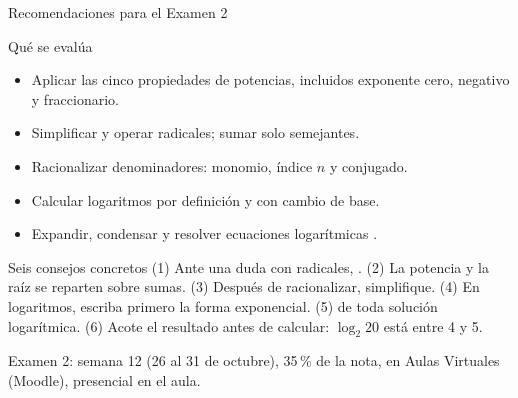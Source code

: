\documentclass[aspectratio=169,10pt]{beamer}
\begin{document}
\begin{frame}{Recomendaciones para el Examen 2}
  \begin{block}{Qué se evalúa}
    \tiny
    \begin{itemize}\setlength{\itemsep}{-0.02cm}
      \item Aplicar las cinco propiedades de potencias, incluidos exponente
            cero, negativo y fraccionario.
      \item Simplificar y operar radicales; sumar solo semejantes.
      \item Racionalizar denominadores: monomio, índice $n$ y conjugado.
      \item Calcular logaritmos por definición y con cambio de base.
      \item Expandir, condensar y resolver ecuaciones logarítmicas
            .
    \end{itemize}
  \end{block}

  \vspace{0.08cm}
  \begin{alertblock}{Seis consejos concretos}
    \tiny
    (1) Ante una duda con radicales, .
    \quad (2) La potencia y la raíz  se reparten sobre sumas.
    \quad (3) Después de racionalizar, simplifique. \quad
    (4) En logaritmos, escriba primero la forma exponencial. \quad
    (5)  de toda solución logarítmica. \quad
    (6) Acote el resultado antes de calcular: $\log_2 20$ está entre 4 y 5.
  \end{alertblock}

  \vspace{0.05cm}
  {\tiny\color{uniGris} Examen 2: semana 12 (26 al 31 de octubre), 35\,\% de la
  nota, en Aulas Virtuales (Moodle), presencial en el aula.}
\end{frame}
\end{document}
